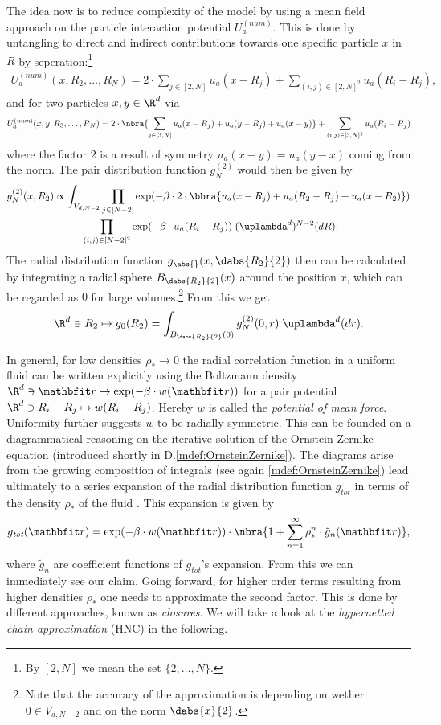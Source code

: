 The idea now is to reduce complexity of the model by using a mean field approach on the particle interaction potential $U_a^{(\textit{num})}$. This is done by untangling to direct and indirect contributions towards one specific particle $x$ in $R$ by seperation:\footnote{By $[2,N]$ we mean the set $\{2,\ldots,N\}$.}
\begin{align*}
    U_a^{(\textit{num})}(x,R_2,\ldots,R_N) = 2\cdot\sum_{j\in[2,N]}u_a(x - R_j) + \sum_{(i,j)\in[2,N]^2}u_a(R_i - R_j),
\end{align*}
and for two particles $x,y\in\R^d$ via 
\[
    U_a^{(\textit{num})}(x,y,R_3,\ldots,R_N) = 2\cdot\nbra{
        \sum_{j\in[3,N]}u_a(x - R_j) + u_a(y - R_j) + u_a(x - y)
    } + \sum_{(i,j)\in[3,N]^2}u_a(R_i - R_j)
\]
where the factor $2$ is a result of symmetry $u_a(x - y) = u_a(y - x)$ coming from the norm. The pair distribution function $g_N^{(2)}$ would then be given by 
\begin{multline*}
    g_N^{(2)}(x,R_2) \propto \int_{V_{d,N-2}}\prod_{j\in[N-2]}\exp(-\beta\cdot2\cdot\bbra{u_a(x - R_j) + u_a(R_2 - R_j) + u_a(x - R_2)})\\
    \cdot\prod_{(i,j)\in[N-2]^2}\exp(-\beta\cdot u_a(R_i - R_j))\;(\uplambda^d)^{N-2}(dR).
\end{multline*}
The radial distribution function $g_{\abs{}}(x,\dabs{R_2}{2})$ then can be calculated by integrating a radial sphere $B_{\dabs{R_2}{2}}(x)$ around the position $x$, which can be regarded as $0$ for large volumes.\footnote{Note that the accuracy of the approximation is depending on wether $0\in V_{d,N-2}$ and on the norm $\dabs{x}{2}$.} From this we get 
\[
    \R^d\ni R_2\mapsto g_0(R_2) = \int_{B_{\dabs{R_2}{2}}(0)}g_N^{(2)}(0,r)\;\uplambda^d(dr).
\]

In general, for low densities $\rho_*\to 0$ the radial correlation function in a uniform fluid can be written explicitly using the Boltzmann density $\R^d\ni \vr\mapsto \exp(-\beta\cdot w(\vr))$ \cite[eq. 2.6.10]{book:HANSEN201313} for a pair potential $\R^d\ni R_i - R_j\mapsto w(R_i - R_j)$. Hereby $w$ is called the \emph{potential of mean force}. Uniformity further suggests $w$ to be radially symmetric. This can be founded on a diagrammatical reasoning on the iterative solution of the Ornstein-Zernike equation (introduced shortly in D.\ref{mdef:OrnsteinZernike}). The diagrams arise from the growing composition of integrals (see again \ref{mdef:OrnsteinZernike}) lead ultimately to a series expansion of the radial distribution function $g_{\textit{tot}}$ in terms of the density $\rho_*$ of the fluid \cite{book:HANSEN.chap4}. This expansion is given by
\[
    g_{\textit{tot}}(\vr) = \exp(-\beta\cdot w(\vr))\cdot\nbra{1 + \sum_{n = 1}^\infty\rho_*^n\cdot \tilde g_n(\vr)},
\]
where $\tilde g_n$ are coefficient functions of $g_{\textit{tot}}$'s expansion. From this we can immediately see our claim. Going forward, for higher order terms resulting from higher densities $\rho_*$ one needs to approximate the second factor. This is done by different approaches, known as \emph{closures}. We will take a look at the \emph{hypernetted chain approximation} (HNC) in the following.

